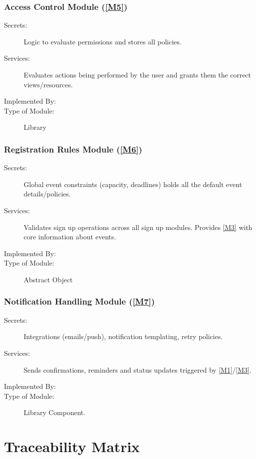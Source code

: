 \documentclass[12pt, titlepage]{article}
\begin{document}
\subsubsection{Access Control Module (\ref{M5})}

\begin{description}
\item[Secrets:] Logic to evaluate permissions and stores all policies.
\item[Services:] Evaluates actions being performed by the user and grants them the correct views/resources. 
\item[Implemented By:] \progname{}
\item[Type of Module:] Library
\end{description}


\subsubsection{Registration Rules Module (\ref{M6})}

\begin{description}
\item[Secrets:] Global event constraints (capacity, deadlines) holds all the default event details/policies.
\item[Services:] Validates sign up operations across all sign up modules. Provides \ref{M3} with core information about events.
\item[Implemented By:] \progname{}
\item[Type of Module:] Abstract Object
\end{description}

\subsubsection{Notification Handling Module (\ref{M7})}

\begin{description}
\item[Secrets:] Integrations (emails/push), notification templating, retry policies.
\item[Services:] Sends confirmations, reminders and status updates triggered by \ref{M1}/\ref{M3}.
\item[Implemented By:] \progname{}
\item[Type of Module:] Library Component.
\end{description}

\section{Traceability Matrix} \label{SecTM}
\end{document}
